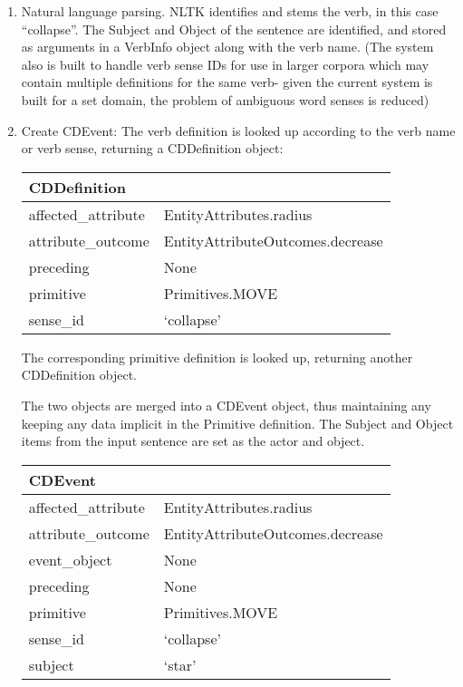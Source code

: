 \documentclass[dissertation.tex]{subfiles}
\begin{document}
    \begin{enumerate}
    \item Natural language parsing. NLTK identifies and stems the verb, in this case ``collapse''. The Subject and Object of the sentence are identified, and stored as arguments in a VerbInfo object along with the verb name. (The system also is built to handle verb sense IDs for use in larger corpora which may contain multiple definitions for the same verb- given the current system is built for a set domain, the problem of ambiguous word senses is reduced)

    \item Create CDEvent: The verb definition is looked up according to the verb name or verb sense, returning a CDDefinition object:
    
    \begin{tabular}{l l}
        \toprule
        \textbf{CDDefinition}\\
        \midrule
        affected\_attribute & EntityAttributes.radius\\
        attribute\_outcome & EntityAttributeOutcomes.decrease\\
        preceding & None\\
        primitive & Primitives.MOVE\\
        sense\_id & `collapse'\\
        \bottomrule
    \end{tabular}

    The corresponding primitive definition is looked up, returning another CDDefinition object.

    The two objects are merged into a CDEvent object, thus maintaining any keeping any data implicit in the Primitive definition. The Subject and Object items from the input sentence are set as the actor and object.

    \begin{tabular}{l l}
        \toprule
        \textbf{CDEvent}\\
        \midrule
        affected\_attribute & EntityAttributes.radius \\
        attribute\_outcome & EntityAttributeOutcomes.decrease \\
        event\_object & None\\
        preceding & None\\
        primitive & Primitives.MOVE \\
        sense\_id & `collapse'\\
        subject & `star'\\
        \bottomrule
    \end{tabular}


\end{enumerate}
\end{document}
